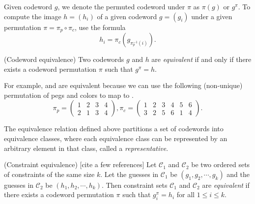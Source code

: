 Given codeword $g$, we denote the permuted codeword under $\pi$ as $\pi(g)$ or $g^\pi$. 
To compute the image $h = (h_i)$ of a given codeword $g = (g_i)$ under a given permutation $\pi = \pi_p \circ \pi_c$, use the formula
\[
h_i = \pi_c\left(g_{\pi_p^{-1}(i)}\right) .
\]

%

\begin{definition}
(Codeword equivalence) Two codewords $g$ and $h$ are \emph{equivalent} if and only if there exists a codeword permutation $\pi$ such that $g^\pi = h$.
\end{definition}

For example,  and  are equivalent because we can use the following (non-unique) permutation of pegs and colors to map  to .
\[
\pi_p = 
\begin{pmatrix}
1 & 2 & 3 & 4 \\
2 & 1 & 3 & 4
\end{pmatrix}
, \pi_c = 
\begin{pmatrix}
1 & 2 & 3 & 4 & 5 & 6 \\
3 & 2 & 5 & 6 & 1 & 4 
\end{pmatrix} .
\]

The equivalence relation defined above partitions a set of codewords into equivalence classes, where each equivalence class can be represented by an arbitrary element in that class, called a \emph{representative}. 

\begin{definition}
(Constraint equivalence) [cite a few references] Let $\mathcal{C}_1$ and $\mathcal{C}_2$ be two ordered sets of constraints of the same size $k$. Let the guesses in $\mathcal{C}_1$ be $(g_1,g_2,\cdots,g_k)$ and the guesses in $\mathcal{C}_2$ be $(h_1,h_2,\cdots,h_k)$. Then constraint sets $\mathcal{C}_1$ and $\mathcal{C}_2$ are \emph{equivalent} if there exists a codeword permutation $\pi$ such that
$g_i^\pi = h_i$ for all $1 \le i \le k$.
\end{definition}

